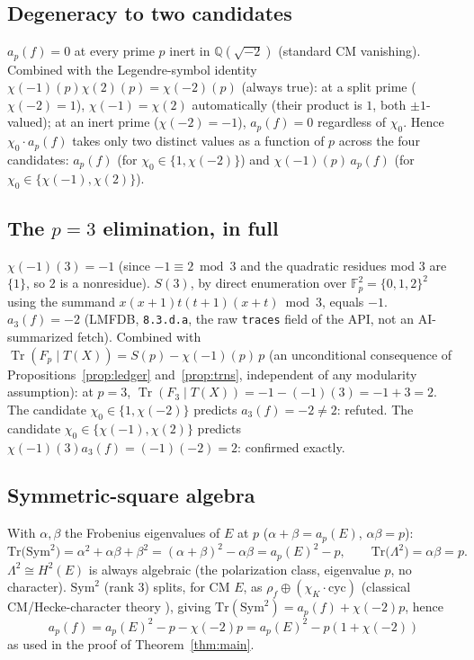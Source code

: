\documentclass[11pt]{amsart}
\theoremstyle{definition}
\newcommand{\Fp}{\mathbb{F}_p}
\newcommand{\Q}{\mathbb{Q}}
\DeclareMathOperator{\Tr}{Tr}
\begin{document}
\subsection*{Degeneracy to two candidates}

$a_p(f)=0$ at every prime $p$ inert in $\Q(\sqrt{-2})$ (standard CM vanishing). Combined with the Legendre-symbol identity $\chi(-1)(p)\chi(2)(p)=\chi(-2)(p)$ (always true): at a split prime ($\chi(-2)=1$), $\chi(-1)=\chi(2)$ automatically (their product is $1$, both $\pm1$-valued); at an inert prime ($\chi(-2)=-1$), $a_p(f)=0$ regardless of $\chi_0$. Hence $\chi_0\cdot a_p(f)$ takes only two distinct values as a function of $p$ across the four candidates: $a_p(f)$ (for $\chi_0\in\{1,\chi(-2)\}$) and $\chi(-1)(p)\,a_p(f)$ (for $\chi_0\in\{\chi(-1),\chi(2)\}$).

\subsection*{The \texorpdfstring{$p=3$}{p=3} elimination, in full}

$\chi(-1)(3)=-1$ (since $-1\equiv2\bmod3$ and the quadratic residues mod $3$ are $\{1\}$, so $2$ is a nonresidue). $S(3)$, by direct enumeration over $\Fp^2=\{0,1,2\}^2$ using the summand $x(x+1)t(t+1)(x+t)\bmod3$, equals $-1$. $a_3(f)=-2$ (LMFDB, \texttt{8.3.d.a}, the raw \texttt{traces} field of the API, not an AI-summarized fetch). Combined with $\Tr(F_p\mid T(X))=S(p)-\chi(-1)(p)\,p$ (an unconditional consequence of Propositions~\ref{prop:ledger} and~\ref{prop:trns}, independent of any modularity assumption): at $p=3$, $\Tr(F_3\mid T(X))=-1-(-1)(3)=-1+3=2$. The candidate $\chi_0\in\{1,\chi(-2)\}$ predicts $a_3(f)=-2\ne2$: refuted. The candidate $\chi_0\in\{\chi(-1),\chi(2)\}$ predicts $\chi(-1)(3)a_3(f)=(-1)(-2)=2$: confirmed exactly.

\subsection*{Symmetric-square algebra}

With $\alpha,\beta$ the Frobenius eigenvalues of $E$ at $p$ ($\alpha+\beta=a_p(E)$, $\alpha\beta=p$):
\[
\mathrm{Tr}\bigl(\mathrm{Sym}^2\bigr)=\alpha^2+\alpha\beta+\beta^2=(\alpha+\beta)^2-\alpha\beta=a_p(E)^2-p,\qquad \mathrm{Tr}\bigl(\Lambda^2\bigr)=\alpha\beta=p.
\]
$\Lambda^2\cong H^2(E)$ is always algebraic (the polarization class, eigenvalue $p$, no character). $\mathrm{Sym}^2$ (rank $3$) splits, for CM $E$, as $\rho_f\oplus(\chi_K\cdot\mathrm{cyc})$ (classical CM/Hecke-character theory \cite{CMtheory}), giving $\mathrm{Tr}(\mathrm{Sym}^2)=a_p(f)+\chi(-2)p$, hence
\[
a_p(f)=a_p(E)^2-p-\chi(-2)p=a_p(E)^2-p(1+\chi(-2))
\]
as used in the proof of Theorem~\ref{thm:main}.
\end{document}
